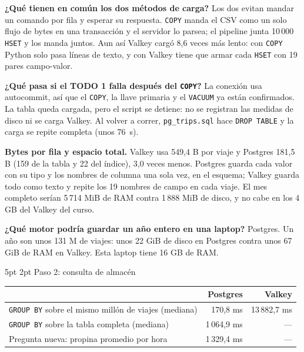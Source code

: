 \documentclass[10pt,letterpaper]{article}
\makeatletter
\renewcommand\subsection{\@startsection{subsection}{2}{\z@}%
  {5pt \@plus 1pt}{2pt}%
  {\normalfont\small\bfseries\color{acc}}}
\makeatother
\begin{document}
\textbf{¿Qué tienen en común los dos métodos de carga?} Los dos evitan mandar un comando por fila y
esperar su respuesta. \texttt{COPY} manda el CSV como un solo flujo de bytes en una transacción y el
servidor lo parsea; el pipeline junta 10\,000 \texttt{HSET} y los manda juntos. Aun así Valkey cargó
8,6 veces más lento: con \texttt{COPY} Python solo pasa líneas de texto, y con Valkey tiene que armar
cada \texttt{HSET} con 19 pares campo-valor.

\textbf{¿Qué pasa si el TODO 1 falla después del \texttt{COPY}?} La conexión usa autocommit, así que
el \texttt{COPY}, la llave primaria y el \texttt{VACUUM} ya están confirmados. La tabla queda cargada,
pero el script se detiene: no se registran las medidas de disco ni se carga Valkey. Al volver a correr,
\texttt{pg\_trips.sql} hace \texttt{DROP TABLE} y la carga se repite completa (unos 76~s).

\textbf{Bytes por fila y espacio total.} Valkey usa 549,4 B por viaje y Postgres 181,5 B (159 de la
tabla y 22 del índice), 3,0 veces menos. Postgres guarda cada valor con su tipo y los nombres de columna
una sola vez, en el esquema; Valkey guarda todo como texto y repite los 19 nombres de campo en cada
viaje. El mes completo serían 5\,714 MiB de RAM contra 1\,888 MiB de disco, y no cabe en los 4 GB del
Valkey del curso.

\textbf{¿Qué motor podría guardar un año entero en una laptop?} Postgres. Un año son unos 131 M de
viajes: unos 22 GiB de disco en Postgres contra unos 67 GiB de RAM en Valkey. Esta laptop tiene 16 GB
de RAM.

\subsection{Paso 2: consulta de almacén}

\begin{center}\footnotesize
\begin{tabular}{@{}lrr@{}}
\toprule
& \textbf{Postgres} & \textbf{Valkey} \\
\midrule
\texttt{GROUP BY} sobre el mismo millón de viajes (mediana) & 170,8 ms & 13\,882,7 ms \\
\texttt{GROUP BY} sobre la tabla completa (mediana) & 1\,064,9 ms & --- \\
Pregunta nueva: propina promedio por hora & 1\,329,4 ms & --- \\
\bottomrule
\end{tabular}
\end{center}
\end{document}
